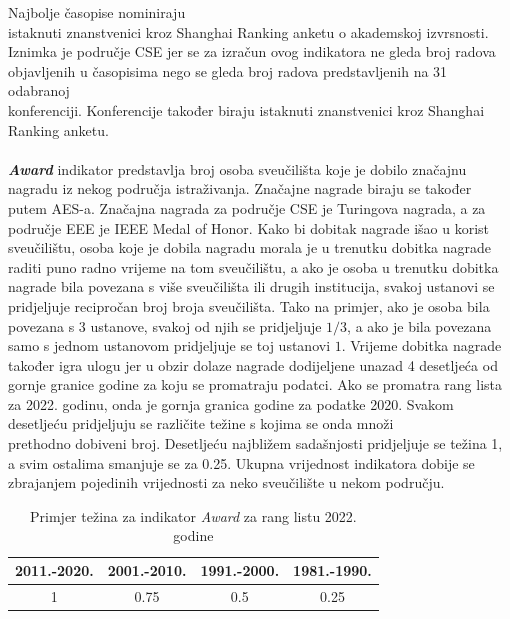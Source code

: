 \documentclass[times, utf8, zavrsni]{fer}
\begin{document}
Najbolje časopise nominiraju \\istaknuti znanstvenici kroz Shanghai Ranking anketu o akademskoj izvrsnosti. \\Iznimka je područje CSE 
jer se za izračun ovog indikatora ne gleda broj radova \\objavljenih u časopisima nego se gleda broj radova predstavljenih na 31 odabranoj \\konferenciji.
Konferencije također biraju istaknuti znanstvenici kroz Shanghai \\Ranking anketu.
\\ \\\textbf{\emph{Award}} indikator predstavlja broj osoba sveučilišta koje je dobilo značajnu nagradu iz nekog područja istraživanja. Značajne nagrade 
biraju se također putem AES-a. Značajna nagrada za područje CSE je Turingova 
nagrada, a za područje EEE je IEEE Medal of Honor.
Kako bi dobitak nagrade išao u korist sveučilištu, osoba koje je dobila nagradu morala je u trenutku dobitka nagrade raditi puno radno vrijeme na 
tom sveučilištu, a ako  je osoba u trenutku dobitka nagrade bila povezana s više sveučilišta ili drugih institucija, svakoj ustanovi se pridjeljuje
recipročan broj broja sveučilišta. Tako na primjer, ako je osoba bila povezana s 3 ustanove, svakoj od njih se pridjeljuje $1/3$, a ako je bila 
povezana samo s jednom ustanovom pridjeljuje se toj ustanovi $1$. 
Vrijeme dobitka nagrade također igra ulogu jer u obzir dolaze nagrade dodijeljene unazad 4 desetljeća od gornje granice godine za koju se promatraju podatci.
Ako se promatra rang lista za 2022. godinu, onda je gornja granica godine za podatke 2020. Svakom desetljeću pridjeljuju se različite težine 
s kojima se onda množi \\prethodno dobiveni broj. Desetljeću najbližem sadašnjosti pridjeljuje se težina 1, a svim ostalima smanjuje se za 0.25.
Ukupna vrijednost indikatora dobije se zbrajanjem pojedinih vrijednosti za neko sveučilište u nekom području.

\begin{table}[htb]
    \caption{Primjer težina za indikator \emph{Award} za rang listu 2022. godine}
        \label{tbl:konstante2}
        \centering
        \begin{tabular}{cccc} \hline
        2011.-2020. & 2001.-2010. & 1991.-2000. & 1981.-1990.\\ \hline
        1&0.75&0.5&0.25\\
        \end{tabular}
        \end{table}    
        \FloatBarrier
\end{document}
